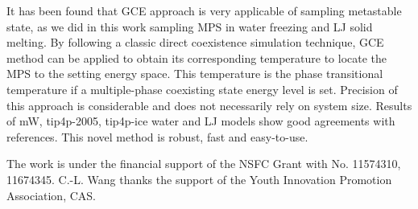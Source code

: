 \documentclass[aps,prl,twocolumn,superscriptaddress]{revtex4-1}
\begin{document}
It has been found that GCE approach is very applicable of sampling metastable state, as we did in this work sampling MPS in water freezing and LJ solid melting. By following a classic direct coexistence simulation technique, GCE method can be applied to obtain its corresponding temperature to locate the MPS to the setting energy space. This temperature is the phase transitional temperature if a multiple-phase coexisting state energy level is set. Precision of this approach is considerable and does not necessarily rely on system size. Results of mW, tip4p-2005, tip4p-ice water and LJ models show good agreements with references. This novel method is robust, fast and easy-to-use.
    
The work is under the financial support of the NSFC Grant with No. 11574310, 11674345. C.-L. Wang thanks the support of the Youth Innovation Promotion Association, CAS. 



\end{document}
